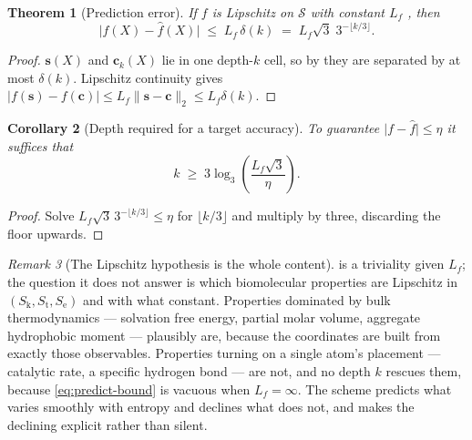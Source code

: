 \documentclass[11pt,twocolumn,a4paper]{article}
\theoremstyle{thmstyle}
\newtheorem{theorem}{Theorem}[section]
\newtheorem{corollary}[theorem]{Corollary}
\theoremstyle{definition}
\theoremstyle{remark}
\newtheorem{remark}[theorem]{Remark}
\newcommand{\Sk}{S_{\mathrm{k}}}
\newcommand{\St}{S_{\mathrm{t}}}
\newcommand{\Se}{S_{\mathrm{e}}}
\newcommand{\Sspace}{\mathcal{S}}
\newcommand{\abs}[1]{\lvert#1\rvert}
\newcommand{\norm}[1]{\lVert#1\rVert}
\begin{document}
\begin{theorem}[Prediction error]
\label{thm:predict}
If $f$ is Lipschitz on $\Sspace$ with constant $L_f$
\citep{lipschitz1876}, then
\begin{equation}
  \bigl\lvert f(X) - \hat f(X)\bigr\rvert
  \;\leq\; L_f\,\delta(k)
  \;=\; L_f\sqrt3\;3^{-\lfloor k/3\rfloor}.
  \label{eq:predict-bound}
\end{equation}
\end{theorem}

\begin{proof}
$\mathbf{s}(X)$ and $\mathbf{c}_k(X)$ lie in one depth-$k$ cell, so by
 they are separated by at most $\delta(k)$.
Lipschitz continuity gives
$\abs{f(\mathbf{s})-f(\mathbf{c})} \leq L_f\norm{\mathbf{s}-
\mathbf{c}}_2 \leq L_f\delta(k)$.
\end{proof}

\begin{corollary}[Depth required for a target accuracy]
\label{cor:depth-from-acc}
To guarantee $\abs{f-\hat f}\leq\eta$ it suffices that
\begin{equation}
  k \;\geq\; 3\log_3\!\left(\frac{L_f\sqrt3}{\eta}\right).
  \label{eq:depth-needed}
\end{equation}
\end{corollary}

\begin{proof}
Solve $L_f\sqrt3\,3^{-\lfloor k/3\rfloor}\leq\eta$ for
$\lfloor k/3\rfloor$ and multiply by three, discarding the floor
upwards.
\end{proof}

\begin{remark}[The Lipschitz hypothesis is the whole content]
\label{rem:lipschitz-honest}
 is a triviality given $L_f$; the question it does
not answer is which biomolecular properties are Lipschitz in
$(\Sk,\St,\Se)$ and with what constant. Properties dominated by bulk
thermodynamics --- solvation free energy, partial molar volume,
aggregate hydrophobic moment --- plausibly are, because the
coordinates are built from exactly those observables. Properties
turning on a single atom's placement --- catalytic rate, a specific
hydrogen bond --- are not, and no depth $k$ rescues them, because
\eqref{eq:predict-bound} is vacuous when $L_f = \infty$. The scheme
predicts what varies smoothly with entropy and declines what does not,
and  makes the declining explicit rather than
silent.
\end{remark}
\end{document}
